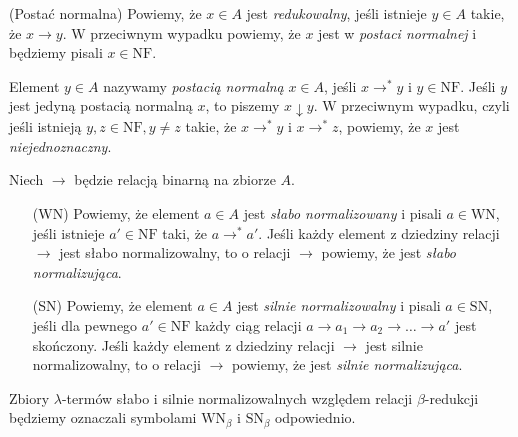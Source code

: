 \begin{definicja}(Postać normalna)
  Powiemy, że \(x\in A\) jest \emph{redukowalny}, jeśli istnieje \(y\in A\) takie, że \(x\to y\). W przeciwnym wypadku powiemy, że \(x\) jest w \emph{postaci normalnej} i będziemy pisali \(x\in\mathrm{NF}\). 
  
  Element \(y\in A\) nazywamy \emph{postacią normalną} \(x\in A\), jeśli \(x\to^{*}y\) i \(y\in\mathrm{NF}\). Jeśli \(y\) jest jedyną postacią normalną \(x\), to piszemy \(x\downarrow y\). W przeciwnym wypadku, czyli jeśli istnieją \(y, z\in \mathrm{NF}, y\neq z\) takie, że \(x\to^{*} y\) i \(x\to^{*} z\), powiemy, że \(x\) jest \emph{niejednoznaczny}. 
\end{definicja}

\begin{definicja}
  Niech \(\to\) będzie relacją binarną na zbiorze \(A\). 
\begin{enumerate}
  \setlength\itemsep{0em}
  \item[(WN) ] Powiemy, że element \(a\in A\) jest \emph{słabo normalizowany} i pisali \(a\in \mathrm{WN}\), jeśli
    istnieje \(a'\in \mathrm{NF}\) taki, że \(a\to^{*} a'\). Jeśli każdy element z dziedziny
    relacji \(\to\) jest słabo normalizowalny, to o relacji \(\to\) powiemy, że jest
    \emph{słabo normalizująca}.
  \item[(SN)] Powiemy, że element \(a\in A\) jest \emph{silnie normalizowalny}  i pisali \(a\in \mathrm{SN}\), jeśli dla pewnego \(a'\in \mathrm{NF}\) każdy ciąg relacji \(a \to a_1 \to a_2 \to \dots \to a'\) jest skończony. Jeśli każdy element z dziedziny relacji 
    \(\to\) jest silnie normalizowalny, to o relacji \(\to\) powiemy, że jest \emph{silnie normalizująca}.
\end{enumerate}
\end{definicja}

\begin{uwaga*}
  Zbiory \(\lambda\)-termów słabo i silnie normalizowalnych względem relacji \(\beta\)-redukcji będziemy oznaczali symbolami \(\mathrm{WN}_\beta\) i \(\mathrm{SN}_\beta\) odpowiednio.
\end{uwaga*}

